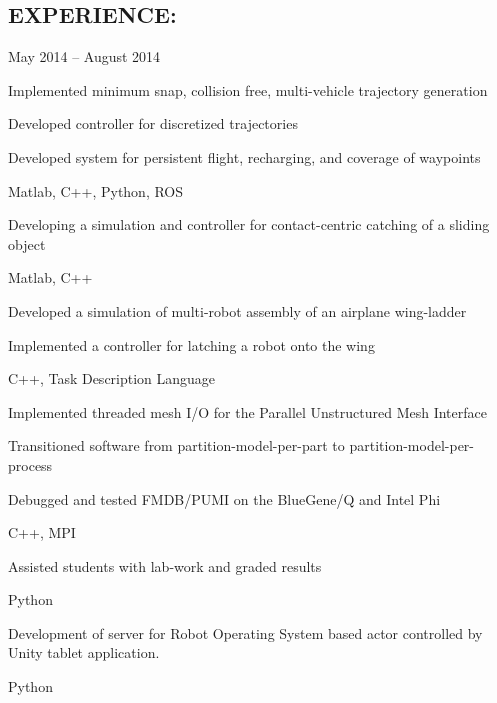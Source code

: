 \begin{resume}
 \section{EXPERIENCE:}      
    {May 2014 -- August 2014}
  {
    \item Implemented minimum snap, collision free, multi-vehicle trajectory
      generation
    \item Developed controller for discretized trajectories
    \item Developed system for persistent flight, recharging, and coverage of waypoints
    \item Matlab, C++, Python, ROS
  }
  {
    \item Developing a simulation and controller for contact-centric catching of a sliding object
    \item Matlab, C++
  }
  {
    \item Developed a simulation of multi-robot assembly of an airplane wing-ladder
    \item Implemented a controller for latching a robot onto the wing 
    \item C++, Task Description Language
  }
  {
		\item Implemented threaded mesh I/O for the Parallel Unstructured Mesh Interface
    \item Transitioned software from partition-model-per-part to partition-model-per-process
		\item Debugged and tested FMDB/PUMI on the BlueGene/Q and Intel Phi
    \item C++, MPI
  }
  {
		\item Assisted students with lab-work and graded results
    \item Python
  }
  {
		\item Development of server for Robot Operating System based actor
			controlled by Unity tablet application.
    \item Python
  }

\end{resume}
